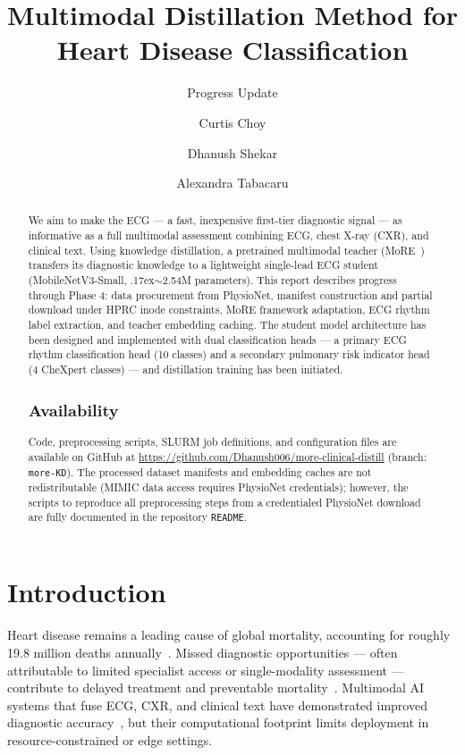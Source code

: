 \documentclass[sigconf,nonacm]{acmart}
\title{Multimodal Distillation Method for Heart Disease Classification}
\subtitle{Progress Update}
\author{Curtis Choy}
\affiliation{\institution{Texas A\&M University}}
\author{Dhanush Shekar}
\affiliation{\institution{Texas A\&M University}}
\author{Alexandra Tabacaru}
\affiliation{\institution{Texas A\&M University}}
\begin{document}
\maketitle

\begin{abstract}
We aim to make the ECG — a fast, inexpensive first-tier diagnostic signal
— as informative as a full multimodal assessment combining ECG, chest
X-ray (CXR), and clinical text. Using knowledge distillation, a pretrained
multimodal teacher (MoRE~\cite{thapa2024more}) transfers its diagnostic
knowledge to a lightweight single-lead ECG student (MobileNetV3-Small,
{\raise.17ex\hbox{$\scriptstyle\sim$}}2.54M parameters). This report
describes progress through Phase 4: data procurement from PhysioNet,
manifest construction and partial download under HPRC inode constraints,
MoRE framework adaptation, ECG rhythm label extraction, and teacher
embedding caching. The student model architecture has been designed and
implemented with dual classification heads — a primary ECG rhythm
classification head (10 classes) and a secondary pulmonary risk indicator
head (4 CheXpert classes) — and distillation training has been initiated.

\subsection*{Availability}
Code, preprocessing scripts, SLURM job definitions, and configuration
files are available on GitHub at
\url{https://github.com/Dhanush006/more-clinical-distill} (branch:
\texttt{more-KD}). The processed dataset manifests and embedding caches
are not redistributable (MIMIC data access requires PhysioNet credentials);
however, the scripts to reproduce all preprocessing steps from a credentialed
PhysioNet download are fully documented in the repository \texttt{README}.
\end{abstract}

\section{Introduction}

Heart disease remains a leading cause of global mortality, accounting for
roughly 19.8 million deaths annually~\cite{who_cvd}. Missed diagnostic
opportunities — often attributable to limited specialist access or
single-modality assessment — contribute to delayed treatment and
preventable mortality~\cite{kwok2022}. Multimodal AI systems that fuse
ECG, CXR, and clinical text have demonstrated improved diagnostic
accuracy~\cite{thapa2024more}, but their computational footprint limits
deployment in resource-constrained or edge settings.
\end{document}
